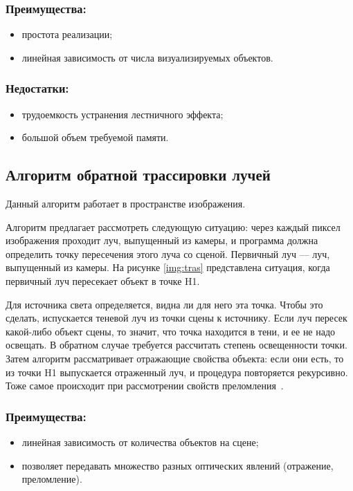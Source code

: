 \subsubsection*{Преимущества:}
\begin{itemize}[label=---]
	\item простота реализации;
	\item линейная зависимость от числа визуализируемых объектов.
\end{itemize}

\subsubsection*{Недостатки:}
\begin{itemize}[label=---]
	\item трудоемкость устранения лестничного эффекта;
	\item большой объем требуемой памяти.
\end{itemize}


\subsection{Алгоритм обратной трассировки лучей}
Данный алгоритм работает в пространстве изображения.

Алгоритм предлагает рассмотреть следующую ситуацию: через каждый пиксел изображения проходит луч, выпущенный из камеры, и программа должна определить точку пересечения этого луча со сценой. Первичный луч --- луч, выпущенный из камеры. На рисунке \ref{img:tras} представлена ситуация, когда первичный луч пересекает объект в точке H1.

\clearpage
{}

Для источника света определяется, видна ли для него эта точка. Чтобы это сделать, испускается теневой луч из точки сцены к источнику. Если луч пересек какой-либо объект сцены, то значит, что точка находится в тени, и ее не надо освещать. В обратном случае требуется рассчитать степень освещенности точки. Затем алгоритм рассматривает отражающие свойства объекта: если они есть, то из точки H1 выпускается отраженный луч, и процедура повторяется рекурсивно. Тоже самое происходит при рассмотрении свойств преломления~\cite{raytrac}. 

\subsubsection*{Преимущества:}
\begin{itemize}[label=---]
	\item линейная зависимость от количества объектов на сцене;
	\item позволяет передавать множество разных оптических явлений (отражение, преломление).
\end{itemize}

